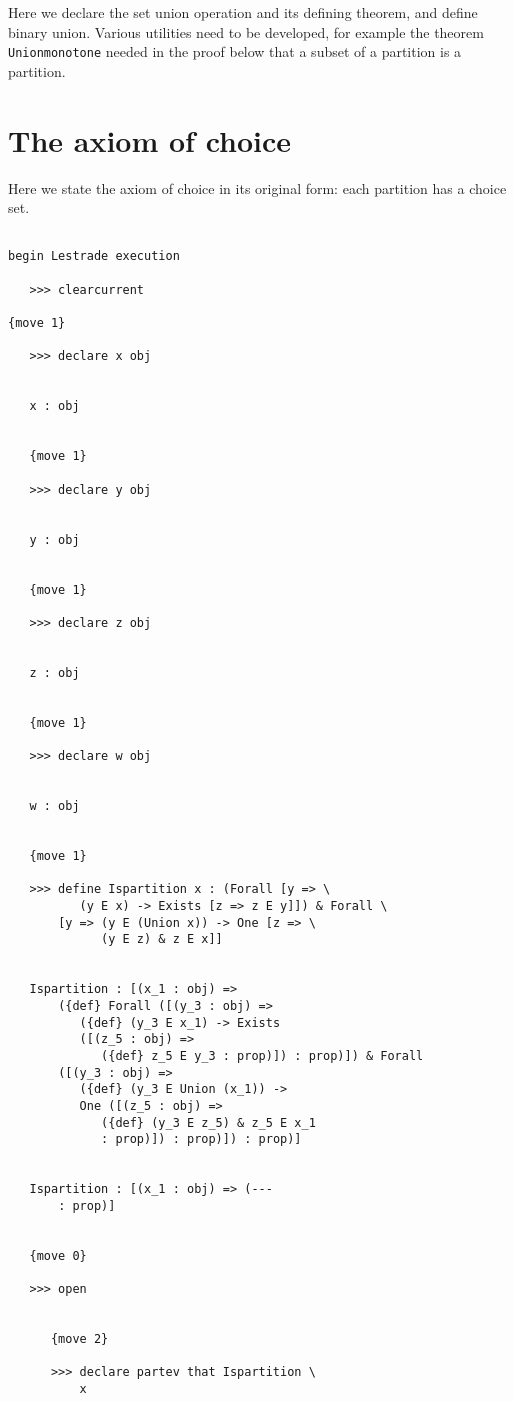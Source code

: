 \documentclass[12pt]{article}
\begin{document}
Here we declare the set union operation and its defining theorem, and define binary union.  Various utilities need to be developed, for example the theorem
{\tt Unionmonotone} needed in the proof below that a subset of a partition is a partition.

\section{The axiom of choice}

Here we state the axiom of choice in its original form:  each partition has a choice set.

\begin{verbatim}

begin Lestrade execution

   >>> clearcurrent

{move 1}

   >>> declare x obj


   x : obj


   {move 1}

   >>> declare y obj


   y : obj


   {move 1}

   >>> declare z obj


   z : obj


   {move 1}

   >>> declare w obj


   w : obj


   {move 1}

   >>> define Ispartition x : (Forall [y => \
          (y E x) -> Exists [z => z E y]]) & Forall \
       [y => (y E (Union x)) -> One [z => \
             (y E z) & z E x]]


   Ispartition : [(x_1 : obj) => 
       ({def} Forall ([(y_3 : obj) => 
          ({def} (y_3 E x_1) -> Exists 
          ([(z_5 : obj) => 
             ({def} z_5 E y_3 : prop)]) : prop)]) & Forall 
       ([(y_3 : obj) => 
          ({def} (y_3 E Union (x_1)) -> 
          One ([(z_5 : obj) => 
             ({def} (y_3 E z_5) & z_5 E x_1 
             : prop)]) : prop)]) : prop)]


   Ispartition : [(x_1 : obj) => (--- 
       : prop)]


   {move 0}

   >>> open


      {move 2}

      >>> declare partev that Ispartition \
          x



\end{verbatim}
\end{document}
